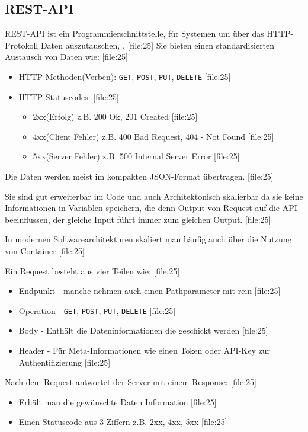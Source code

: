 \subsection{REST-API}

REST-API ist ein Programmierschnittstelle, für Systemen um über das HTTP-Protokoll Daten auszutauschen, . [file:25]
Sie bieten einen standardisierten Austausch von Daten wie: [file:25]

\begin{itemize}
\item HTTP-Methoden(Verben): \texttt{GET}, \texttt{POST}, \texttt{PUT}, \texttt{DELETE} [file:25]
\item HTTP-Statuscodes: [file:25]
\begin{itemize}
\item 2xx(Erfolg) z.B. 200 Ok, 201 Created [file:25]
\item 4xx(Client Fehler) z.B. 400 Bad Request, 404 - Not Found [file:25]
\item 5xx(Server Fehler) z.B. 500 Internal Server Error [file:25]
\end{itemize}
\end{itemize}

Die Daten werden meist im kompakten JSON-Format übertragen. [file:25]

Sie sind gut erweiterbar im Code und auch Architektonisch skalierbar da sie keine Informationen in Variablen speichern, die denn Output von Request auf die API beeinflussen, der gleiche Input führt immer zum gleichen Output. [file:25]

In modernen Softwarearchitekturen skaliert man häufig auch über die Nutzung von Container [file:25]

Ein Request besteht aus vier Teilen wie: [file:25]

\begin{itemize}
\item Endpunkt - manche nehmen auch einen Pathparameter mit rein [file:25]
\item Operation - \texttt{GET}, \texttt{POST}, \texttt{PUT}, \texttt{DELETE} [file:25]
\item Body - Enthält die Dateninformationen die geschickt werden [file:25]
\item Header - Für Meta-Informationen wie einen Token oder API-Key zur Authentifizierung [file:25]
\end{itemize}

Nach dem Request antwortet der Server mit einem Response: [file:25]

\begin{itemize}
\item Erhält man die gewünschte Daten Information [file:25]
\item Einen Statuscode aus 3 Ziffern z.B. 2xx, 4xx, 5xx [file:25]
\end{itemize}